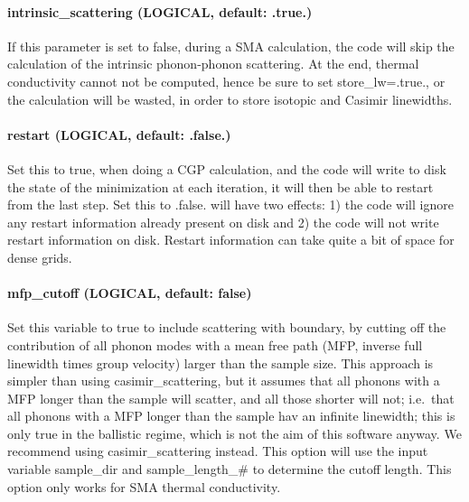 \documentclass[
]{article}
\begin{document}
\hypertarget{intrinsic_scattering-logical-default-.true.}{%
\paragraph{intrinsic\_scattering (LOGICAL, default:
.true.)}\label{intrinsic_scattering-logical-default-.true.}}

If this parameter is set to false, during a SMA calculation, the code
will skip the calculation of the intrinsic phonon-phonon scattering. At
the end, thermal conductivity cannot not be computed, hence be sure to
set store\_lw=.true., or the calculation will be wasted, in order to
store isotopic and Casimir linewidths.

\hypertarget{restart-logical-default-.false.}{%
\paragraph{restart (LOGICAL, default:
.false.)}\label{restart-logical-default-.false.}}

Set this to true, when doing a CGP calculation, and the code will write
to disk the state of the minimization at each iteration, it will then be
able to restart from the last step. Set this to .false. will have two
effects: 1) the code will ignore any restart information already present
on disk and 2) the code will not write restart information on disk.
Restart information can take quite a bit of space for dense grids.

\hypertarget{mfp_cutoff-logical-default-false}{%
\paragraph{mfp\_cutoff (LOGICAL, default:
false)}\label{mfp_cutoff-logical-default-false}}

Set this variable to true to include scattering with boundary, by
cutting off the contribution of all phonon modes with a mean free path
(MFP, inverse full linewidth times group velocity) larger than the
sample size. This approach is simpler than using casimir\_scattering,
but it assumes that all phonons with a MFP longer than the sample will
scatter, and all those shorter will not; i.e.~that all phonons with a
MFP longer than the sample hav an infinite linewidth; this is only true
in the ballistic regime, which is not the aim of this software anyway.
We recommend using casimir\_scattering instead. This option will use the
input variable sample\_dir and sample\_length\_\# to determine the
cutoff length. This option only works for SMA thermal conductivity.
\end{document}
